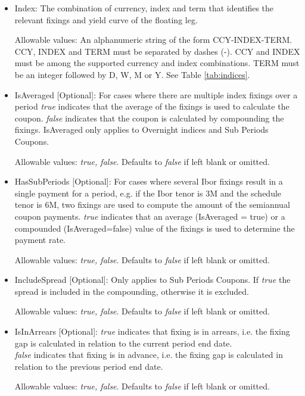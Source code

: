 \begin{itemize}
\item Index:  The combination of currency, index and term that
  identifies the relevant fixings and yield curve of the floating leg.  

  Allowable values: An alphanumeric string of the form CCY-INDEX-TERM. CCY, INDEX and TERM must be separated by dashes (-). CCY and INDEX must be among the supported currency and index combinations. TERM must be an integer followed by D, W,
  M or Y. See Table \ref{tab:indices}.

\item IsAveraged [Optional]:  For cases where there are multiple index fixings over a period \emph{true} indicates that
  the average of the fixings is used to calculate the coupon.  \emph{false} indicates that the coupon is calculated by
  compounding the fixings.  IsAveraged only applies to Overnight indices and Sub Periods Coupons.

Allowable values:  \emph{true, false}. Defaults to \emph{false} if left blank or omitted.

\item HasSubPeriods [Optional]: For cases where several Ibor fixings result in a single payment for a period, e.g. if
  the Ibor tenor is 3M and the schedule tenor is 6M, two fixings are used to compute the amount of the semiannual coupon
  payments. \emph{true} indicates that an average (IsAveraged = true) or a compounded (IsAveraged=false) value of the
  fixings is used to determine the payment rate.

Allowable values:  \emph{true, false}. Defaults to \emph{false} if left blank or omitted.

\item IncludeSpread [Optional]: Only applies to Sub Periods Coupons. If \emph{true} the spread is included in the
  compounding, otherwise it is excluded.

Allowable values:  \emph{true, false}. Defaults to \emph{false} if left blank or omitted.

\item IsInArrears [Optional]:  \emph{true} indicates that  fixing is in arrears,
  i.e. the fixing gap is calculated in relation to the current period
  end date.\\ \emph{false} indicates that  fixing is in advance,
  i.e. the fixing gap is calculated in relation to the previous period
  end date.  

Allowable values:  \emph{true, false}. Defaults to \emph{false} if left blank or omitted.


\end{itemize}
